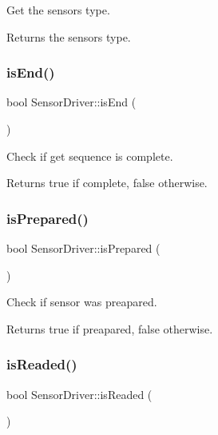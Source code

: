 Get the sensor\textquotesingle{}s type. 

\begin{DoxyReturn}{Returns}
the sensor\textquotesingle{}s type. 
\end{DoxyReturn}
\mbox{\label{classSensorDriver_a8ababf180e52d684416bc6f4c4f90e59}} 
\subsubsection{\texorpdfstring{is\+End()}{isEnd()}}
{\footnotesize\ttfamily bool Sensor\+Driver\+::is\+End (\begin{DoxyParamCaption}{ }\end{DoxyParamCaption})}



Check if get sequence is complete. 

\begin{DoxyReturn}{Returns}
true if complete, false otherwise. 
\end{DoxyReturn}
\mbox{\label{classSensorDriver_a17672e5f12749c3dca5d6c2c4b73b7c3}} 
\subsubsection{\texorpdfstring{is\+Prepared()}{isPrepared()}}
{\footnotesize\ttfamily bool Sensor\+Driver\+::is\+Prepared (\begin{DoxyParamCaption}{ }\end{DoxyParamCaption})\hspace{0.3cm}{\ttfamily [virtual]}}



Check if sensor was preapared. 

\begin{DoxyReturn}{Returns}
true if preapared, false otherwise. 
\end{DoxyReturn}
\mbox{\label{classSensorDriver_a65f1930e35568439dee39259a23a5670}} 
\subsubsection{\texorpdfstring{is\+Readed()}{isReaded()}}
{\footnotesize\ttfamily bool Sensor\+Driver\+::is\+Readed (\begin{DoxyParamCaption}{ }\end{DoxyParamCaption})}



